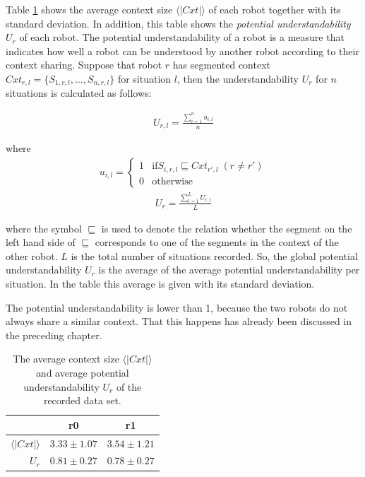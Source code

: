 Table \ref{t:st:data} shows the average context size $\langle |Cxt| \rangle$ of each robot together with its standard deviation. In addition, this table shows the {\em potential understandability} $U_r$ of each robot. The potential understandability of a robot is a measure that indicates how well a robot can be understood by another robot according to their context sharing. Suppose that robot $r$ has segmented context $Cxt_{r,l}=\{S_{1,r,l},\ldots,S_{n,r,l}\}$ for situation $l$, then the understandability $U_r$ for $n$ situations is calculated as follows:

\begin{eqnarray}
U_{r,l}=\frac{\sum_{i=1}^n u_{i,l}}{n}
\end{eqnarray}

where
\begin{eqnarray}
u_{i,l} = \left \{ \begin{array}{rl}
1 & \mbox{if} S_{i,r,l} \sqsubseteq Cxt_{r',l} \; (r \neq r')\\
0 & \mbox{otherwise}
\end{array} \right.
\end{eqnarray}
\begin{eqnarray}
U_r = \frac{\sum_{l=1}^L U_{r,l}}{L}
\end{eqnarray}


where the symbol $\sqsubseteq$ is used to denote the relation whether the segment on the left hand side of $\sqsubseteq$ corresponds to one of the segments in the context of the other robot. $L$ is the total number of situations recorded. So, the global potential understandability $U_r$ is the average of the average potential understandability per situation. In the table this average is given with its standard deviation.

The potential understandability is lower than 1, because the two robots do not always share a similar context. That this happens has already been discussed in the preceding chapter.

\begin{table}
\centering
\begin{tabular}{||r|c|c||}
\hline\hline
 & r0 & r1\\\hline
$\langle|Cxt|\rangle$ & $3.33 \pm 1.07$ & $3.54 \pm 1.21$\\\hline
$U_r$ & $0.81 \pm 0.27$ & $0.78 \pm 0.27$\\\hline
\hline
\end{tabular}
\caption{The average context size $\langle|Cxt|\rangle$ and average potential understandability $U_r$ of the recorded data set.}
\label{t:st:data}
\end{table}



